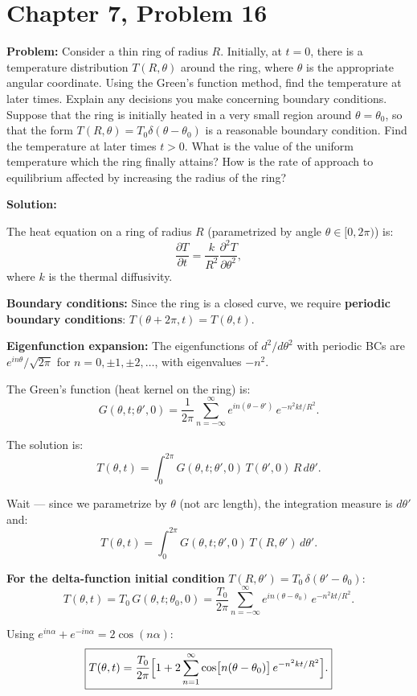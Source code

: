 \documentclass[12pt]{article}
\begin{document}
\section*{Chapter 7, Problem 16}

\textbf{Problem:} Consider a thin ring of radius $R$. Initially, at $t = 0$, there is a temperature distribution $T(R,\theta)$ around the ring, where $\theta$ is the appropriate angular coordinate. Using the Green's function method, find the temperature at later times. Explain any decisions you make concerning boundary conditions. Suppose that the ring is initially heated in a very small region around $\theta = \theta_0$, so that the form $T(R,\theta) = T_0\delta(\theta - \theta_0)$ is a reasonable boundary condition. Find the temperature at later times $t > 0$. What is the value of the uniform temperature which the ring finally attains? How is the rate of approach to equilibrium affected by increasing the radius of the ring?

\bigskip
\textbf{Solution:}

The heat equation on a ring of radius $R$ (parametrized by angle $\theta \in [0,2\pi)$) is:
\[
\frac{\partial T}{\partial t} = \frac{k}{R^2}\frac{\partial^2 T}{\partial\theta^2},
\]
where $k$ is the thermal diffusivity.

\textbf{Boundary conditions:} Since the ring is a closed curve, we require \textbf{periodic boundary conditions}: $T(\theta + 2\pi, t) = T(\theta, t)$.

\textbf{Eigenfunction expansion:} The eigenfunctions of $d^2/d\theta^2$ with periodic BCs are $e^{in\theta}/\sqrt{2\pi}$ for $n = 0, \pm 1, \pm 2, \ldots$, with eigenvalues $-n^2$.

The Green's function (heat kernel on the ring) is:
\[
G(\theta,t;\theta',0) = \frac{1}{2\pi}\sum_{n=-\infty}^{\infty} e^{in(\theta-\theta')}\,e^{-n^2 kt/R^2}.
\]

The solution is:
\[
T(\theta,t) = \int_0^{2\pi} G(\theta,t;\theta',0)\,T(\theta',0)\,R\,d\theta'.
\]

Wait --- since we parametrize by $\theta$ (not arc length), the integration measure is $d\theta'$ and:
\[
T(\theta,t) = \int_0^{2\pi} G(\theta,t;\theta',0)\,T(R,\theta')\,d\theta'.
\]

\textbf{For the delta-function initial condition} $T(R,\theta') = T_0\,\delta(\theta'-\theta_0)$:
\[
T(\theta,t) = T_0\,G(\theta,t;\theta_0,0) = \frac{T_0}{2\pi}\sum_{n=-\infty}^{\infty}e^{in(\theta-\theta_0)}\,e^{-n^2 kt/R^2}.
\]

Using $e^{in\alpha} + e^{-in\alpha} = 2\cos(n\alpha)$:
\[
\boxed{T(\theta,t) = \frac{T_0}{2\pi}\Bigl[1 + 2\sum_{n=1}^{\infty}\cos\bigl[n(\theta-\theta_0)\bigr]\,e^{-n^2 kt/R^2}\Bigr].}
\]
\end{document}
